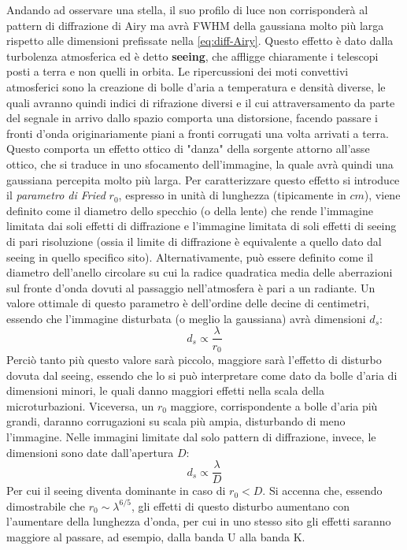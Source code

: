 Andando ad osservare una stella, il suo profilo di luce non corrisponderà al pattern di diffrazione di Airy ma avrà FWHM della gaussiana molto più larga rispetto alle dimensioni prefissate nella \ref{eq:diff-Airy}. Questo effetto è dato dalla turbolenza atmosferica ed è detto \textbf{seeing}, che affligge chiaramente i telescopi posti a terra e non quelli in orbita. Le ripercussioni dei moti convettivi atmosferici sono la creazione di bolle d'aria a temperatura e densità diverse, le quali avranno quindi indici di rifrazione diversi e il cui attraversamento da parte del segnale in arrivo dallo spazio comporta una distorsione, facendo passare i fronti d'onda originariamente piani a fronti corrugati una volta arrivati a terra. Questo comporta un effetto ottico di "danza" della sorgente attorno all'asse ottico, che si traduce in uno sfocamento dell'immagine, la quale avrà quindi una gaussiana percepita molto più larga. Per caratterizzare questo effetto si introduce il \textit{parametro di Fried} $r_0$, espresso in unità di lunghezza (tipicamente in $cm$), viene definito come il diametro dello specchio (o della lente) che rende l'immagine limitata dai soli effetti di diffrazione e l'immagine limitata di soli effetti di seeing di pari risoluzione (ossia il limite di diffrazione è equivalente a quello dato dal seeing in quello specifico sito). Alternativamente, può essere definito come il diametro dell'anello circolare su cui la radice quadratica media delle aberrazioni sul fronte d'onda dovuti al passaggio nell'atmosfera è pari a un radiante. Un valore ottimale di questo parametro è dell'ordine delle decine di centimetri, essendo che l'immagine disturbata (o meglio la gaussiana) avrà dimensioni $d_s$:
\begin{equation*}
	d_s \propto \frac{\lambda}{r_0}
\end{equation*}
Perciò tanto più questo valore sarà piccolo, maggiore sarà l'effetto di disturbo dovuta dal seeing, essendo che lo si può interpretare come dato da bolle d'aria di dimensioni minori, le quali danno maggiori effetti nella scala della microturbazioni. Viceversa, un $r_0$ maggiore, corrispondente a bolle d'aria più grandi, daranno corrugazioni su scala più ampia, disturbando di meno l'immagine. Nelle immagini limitate dal solo pattern di diffrazione, invece, le dimensioni sono date dall'apertura $D$:
\begin{equation*}
	d_s \propto \frac{\lambda}{D}
\end{equation*}
Per cui il seeing diventa dominante in caso di $r_0<D$. Si accenna che, essendo dimostrabile che $r_0\sim \lambda^{6/5}$, gli effetti di questo disturbo aumentano con l'aumentare della lunghezza d'onda, per cui in uno stesso sito gli effetti saranno maggiore al passare, ad esempio, dalla banda U alla banda K.

